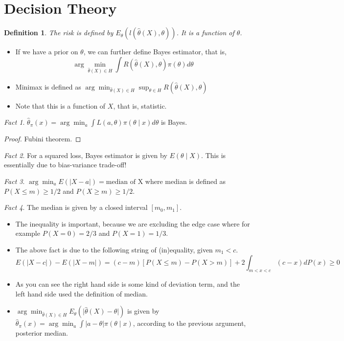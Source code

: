 \documentclass[11pt,reqno]{amsart}
\newtheorem{definition}{Definition}
\theoremstyle{remark}
\newtheorem{fact}{Fact}
\begin{document}
\section{Decision Theory}
\begin{definition}
The risk is defined by $E_\theta(l(\hat\theta(X),\theta))$. It is a function of $\theta$.
\end{definition}
\begin{itemize}
\item If we have a prior on $\theta$, we can further define Bayes estimator, that is, 
$$
\arg\min_{\hat\theta(X)\in H}\int R(\hat\theta(X),\theta)\pi(\theta)d\theta
$$
\item Minimax is defined as $\arg\min_{\hat\theta(X)\in H}\sup_{\theta\in H}R(\hat\theta(X),\theta)$
\item Note that this is a function of $X$, that is, statistic. 
\end{itemize}
\begin{fact}
$\hat\theta_\pi(x)=\arg\min_a\int L(a,\theta)\pi(\theta\mid x)d\theta$ is Bayes.
\end{fact}
\begin{proof}
Fubini theorem.
\end{proof}
\begin{fact}
For a squared loss, Bayes estimator is given by $E(\theta\mid X)$. This is essentially due to bias-variance trade-off!
\end{fact}
\begin{fact}
$\arg\min_a E(\lvert X-a\rvert)=\text{median of X}$ where median is defined as $P(X\leq m)\geq 1/2$ and $P(X\geq m)\geq 1/2$.
\end{fact}
\begin{fact}
The median is given by a closed interval $[m_0,m_1]$.
\end{fact}
\begin{itemize}
\item The inequality is important, because we are excluding the edge case where for example $P(X=0)=2/3$ and $P(X=1)=1/3$.
\item The above fact is due to the following string of (in)equality, given $m_1<c$.
$$
E(\lvert X-c\rvert)-E(\lvert X-m\rvert)=(c-m)[P(X\leq m)-P(X > m)]+2\int_{m<x<c} (c-x)dP(x)\geq 0
$$
\item As you can see the right hand side is some kind of deviation term, and the left hand side used the definition of median.
\item $\arg\min_{\hat\theta(X)\in H} E_\theta(\lvert \hat\theta(X)-\theta\rvert)$ is given by $\hat\theta_\pi(x)=\arg\min_a\int \lvert a-\theta\lvert \pi(\theta\mid x)$, according to the previous argument, posterior median.
\end{itemize}
\end{document}
